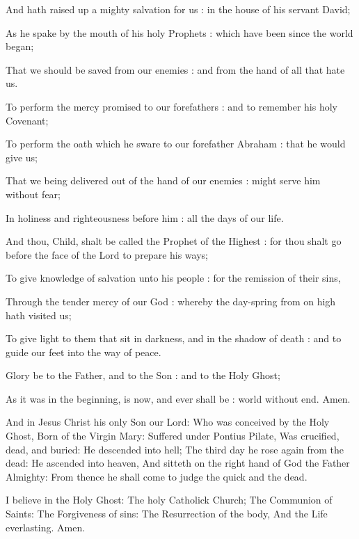 And hath raised up a mighty salvation for us : in the house of his servant David;

As he spake by the mouth of his holy Prophets : which have been since the world began;

That we should be saved from our enemies : and from the hand of all that hate us.

To perform the mercy promised to our forefathers : and to remember his holy Covenant;

To perform the oath which he sware to our forefather Abraham : that he would give us;

That we being delivered out of the hand of our enemies : might serve him without fear;

In holiness and righteousness before him : all the days of our life.

And thou, Child, shalt be called the Prophet of the Highest : for thou shalt go before the face of the Lord to prepare his ways;

To give knowledge of salvation unto his people : for the remission of their sins,

Through the tender mercy of our God : whereby the day-spring from on high hath visited us;

To give light to them that sit in darkness, and in the shadow of death : and to guide our feet into the way of peace.

Glory be to the Father, and to the Son : and to the Holy Ghost;

As it was in the beginning, is now, and ever shall be : world without end. Amen.



And in Jesus Christ his only Son our Lord: Who was conceived by the Holy Ghost, Born of the Virgin Mary: Suffered under Pontius Pilate, Was crucified, dead, and buried: He descended into hell; The third day he rose again from the dead: He ascended into heaven, And sitteth on the right hand of God the Father Almighty: From thence he shall come to judge the quick and the dead.

I believe in the Holy Ghost: The holy Catholick Church; The Communion of Saints: The Forgiveness of sins: The Resurrection of the body, And the Life everlasting. Amen.

